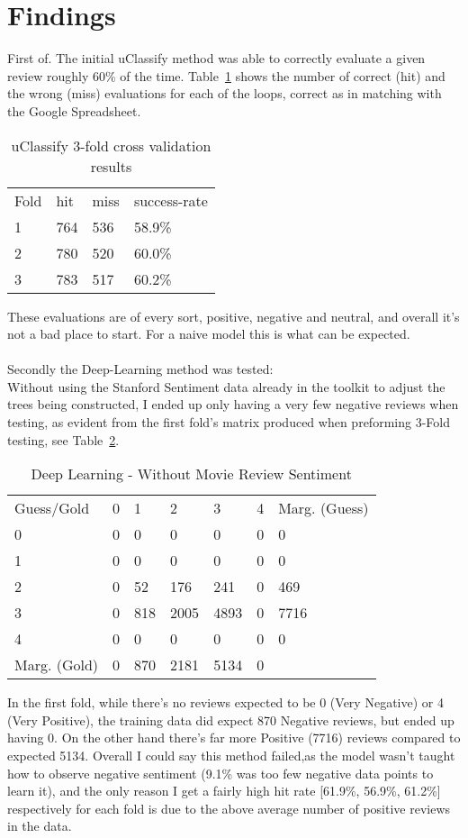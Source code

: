 \documentclass{sig-alternate}
\begin{document}
\section{Findings}
\label{section:findings}
First of. The initial uClassify method was able to correctly evaluate a given review roughly 60\% of the time. Table~\ref{table:uClassify} shows the number of correct (hit) and the wrong (miss) evaluations for each of the loops, correct as in matching with the Google Spreadsheet.
\begin{table}[h!]
\centering
\caption{uClassify 3-fold cross validation results}
\begin{tabular}{l l l l}
Fold & hit & miss &success-rate\\
1 & 764 & 536 &58.9\%\\
2 & 780 & 520 & 60.0\%\\
3 & 783 & 517 & 60.2\%
\end{tabular}
\label{table:uClassify}
\end{table}
These evaluations are of every sort, positive, negative and neutral, and overall it's not a bad place to start. For a naive model this is what can be expected.\\
~\\

Secondly the Deep-Learning method was tested:\\
Without using the Stanford Sentiment data already in the toolkit to adjust the trees being constructed, I ended up only having a very few negative reviews when testing, as evident from the first fold's matrix produced when preforming 3-Fold testing, see Table~\ref{table:deepnon}.
\begin{table}[h!]
\caption{Deep Learning - Without Movie Review Sentiment}
\begin{tabular}{l l l l l l l}
Guess/Gold & 0 & 1 & 2 & 3 & 4 & Marg. (Guess)\\
0 & 0 & 0 & 0 & 0 & 0 & 0 \\
1&0&0&0&0&0&0\\
               2 &     0  &    52    & 176     &241     &  0 &    469\\
               3      & 0    & 818   & 2005  &  4893 &      0 &   7716\\
               4     &  0     &  0      & 0    &   0     &  0      & 0\\
    Marg. (Gold)     &  0  &   870    &2181    &5134      & 0
\end{tabular}
\label{table:deepnon}
\end{table}
In the first fold, while there's no reviews expected to be 0 (Very Negative) or 4 (Very Positive), the training data did expect 870 Negative reviews, but ended up having 0. On the other hand there's far more Positive (7716) reviews compared to expected 5134. Overall I could say this method failed,as the model wasn't taught how to observe negative sentiment (9.1\% was too few negative data points to learn it), and the only reason I get a fairly high hit rate [61.9\%, 56.9\%, 61.2\%] respectively for each fold is due to the above average number of positive reviews in the data.
\end{document}
